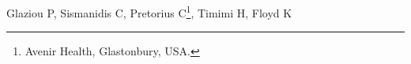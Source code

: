 Glaziou P\footnotemark, Sismanidis C\footnotemark, Pretorius C\footnote{Avenir Health, Glastonbury, USA.}, Timimi H\footnotemark, Floyd K\footnotemark[\value{footnote}]


